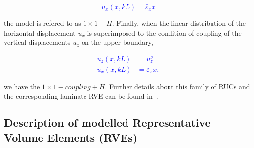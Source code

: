 \documentclass[Review,sagev,times]{sagej}
\begin{document}
\textcolor{blue}{\begin{equation}\label{eq:lineardist}
u_{x}\left(x,kL\right)=\bar{\varepsilon}_{x}x
\end{equation}}

 the model is refered to as $1\times 1-H$.  Finally, when the linear distribution of the horizontal displacement $u_{x}$ is superimposed to the condition of coupling of the vertical displacements $u_{z}$ on the upper boundary,  

\textcolor{blue}{\begin{equation}\label{eq:couplingconditions}
\begin{aligned}
u_{z}\left(x,kL\right)&=u_{z}^{\nu}\\
u_{x}\left(x,kL\right)&=\bar{\varepsilon}_{x}x,
\end{aligned}
\end{equation}}

we have the $1\times 1-coupling+H$. Further details about this family of RUCs and the corresponding laminate RVE can be found in~\cite{DiStasio2019}.


\subsection{Description of modelled Representative Volume Elements (RVEs)}\label{subsec:rve}
\end{document}
